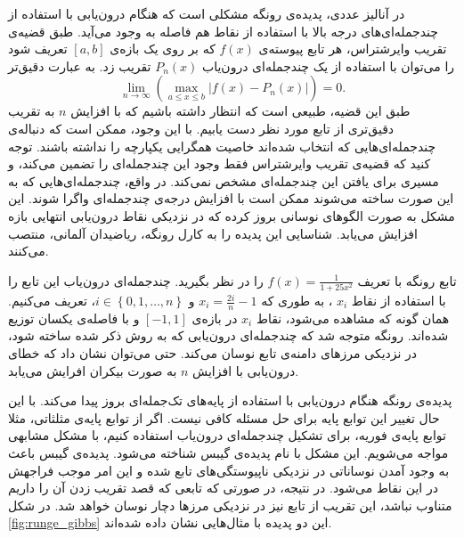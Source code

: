 \documentclass[12pt,onecolumn,a4paper]{article}
\begin{document}
در آنالیز عددی، پدیده‌ی رونگه مشکلی است که هنگام درون‌یابی با استفاده از چندجمله‌ای‌های درجه بالا با استفاده از نقاط هم فاصله به وجود می‌آید. طبق قضیه‌ی تقریب وایرشتراس،
هر تابع پیوسته‌ی 
$f(x)$
که بر روی یک بازه‌ی
$[a,b]$
تعریف شود را می‌توان با استفاده از یک چندجمله‌ای درون‌یاب
$P_n(x)$
تقریب زد. به عبارت دقیق‌تر
\begin{equation*}
    \lim_{n\rightarrow \infty}\left(\max _{{a\leq x\leq b}}\left|f(x)-P_{n}(x)\right|\right)=0.
\end{equation*}
طبق این قضیه، طبیعی است که انتظار داشته باشیم که با افزایش 
$n$
به تقریب دقیق‌تری از تابع مورد نظر دست یابیم. با این وجود، ممکن است که دنباله‌ی چندجمله‌ای‌هایی که انتخاب شده‌اند خاصیت همگرایی یکپارچه را نداشته باشند. توجه کنید که قضیه‌ی تقریب وایرشتراس فقط وجود این چندجمله‌ای را تضمین می‌کند، و مسیری برای یافتن این چندجمله‌ای مشخص نمی‌کند. در واقع، چندجمله‌ای‌هایی که به این صورت ساخته می‌شوند ممکن است با افزایش درجه‌ی چندجمله‌ای واگرا شوند. این مشکل به صورت الگوهای نوسانی بروز کرده که در نزدیکی نقاط درون‌یابی انتهایی بازه افزایش می‌یابد. شناسایی این پدیده را به  کارل رونگه،
ریاضیدان آلمانی، منتصب می‌کنند.

تابع رونگه با تعریف 
$f(x)=\frac{1}{1+25x^2}$ 
را در نظر بگیرید. چندجمله‌ای درون‌یاب این تابع را با استفاده از نقاط 
$x_i$ 
، به طوری که
$x_{i}=\frac{2i}{n}-1$ 
و 
$i\in \left\{0,1,\dots ,n\right\}$،
تعریف می‌کنیم.
همان گونه که مشاهده می‌شود، نقاط 
$x_i$ 
در بازه‌ی 
$[-1,1]$ 
و با فاصله‌ی یکسان توزیع شده‌اند. رونگه متوجه شد که چندجمله‌ای درون‌یابی که به روش ذکر شده ساخته شود، در نزدیکی مرز‌های دامنه‌ی تابع نوسان می‌کند. حتی می‌توان نشان داد که خطای درون‌یابی با افزایش 
$n$ 
 به صورت بیکران افرایش می‌یابد.

پدیده‌ی رونگه هنگام درون‌یابی با استفاده از پایه‌های تک‌جمله‌ای 
بروز پیدا می‌کند. با این حال تغییر این توابع پایه برای حل مسئله کافی نیست. اگر از توابع پایه‌ی مثلثاتی، مثلا توابع پایه‌ی فوریه، برای تشکیل چندجمله‌ای درون‌یاب استفاده کنیم، با مشکل مشابهی مواجه می‌شویم. این مشکل  با نام پدیده‌ی گیبس
شناخته می‌شود. پدیده‌ی گیبس باعث به وجود آمدن نوساناتی در نزدیکی ناپیوستگی‌های تابع شده و این امر موجب فراجهش
در این نقاط می‌شود. در نتیجه، در صورتی که تابعی که قصد تقریب زدن آن را داریم متناوب نباشد، این تقریب از تابع نیز در نزدیکی مرزها دچار نوسان خواهد شد. در شکل 
\ref{fig:runge_gibbs} 
این دو پدیده با مثال‌هایی نشان داده‌ شده‌اند.
\end{document}
